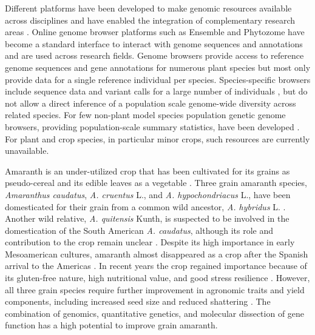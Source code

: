 \documentclass[9pt,twocolumn,twoside]{celabRxiv}
\newcommand{\jgd}[1]{{\small \textcolor{red}{#1}}}
\begin{document}
Different platforms have been developed to make genomic resources available across disciplines and have enabled the integration of complementary research areas \citep{lawrence2004maizegdb, weigel20091001, 1001:2016, joshi20121001, jin2013plncdb}. 
Online genome browser platforms such as Ensemble \citep{bolser2016ensembl} and Phytozome \citep{goodstein2012phytozome} have become a standard interface to interact with genome sequences and annotations and are used across research fields.
Genome browsers provide access to reference genome sequences and gene annotations for numerous plant species but most only provide data for a single reference individual per species.
Species-specific browsers include sequence data and variant calls for a large number of individuals \citep{lawrence2004maizegdb, ming2015pineapple, dash2016legume,hazzouri2015whole, krishnakumar2015araport, mansueto2017rice, kudo2017tomatomics}, but do not allow a direct inference of a population scale genome-wide diversity across related species.
For few non-plant model species population genetic genome browsers, providing population-scale summary statistics, have been developed \citep{10.1093/nar/gkx943,10.1093/bioinformatics/btx301}.
For plant and crop species, in particular minor crops, such resources are currently unavailable.

Amaranth is an under-utilized crop that has been cultivated for its grains as pseudo-cereal and its edible leaves as a vegetable \citep{sauer1967grain,brenner2000genetic, joshi2018zero}. 
Three grain amaranth species, \textit{Amaranthus caudatus}, \textit{A. cruentus} L., and \textit{A. hypochondriacus} L., have been domesticated for their grain from a common wild ancestor, \textit{A. hybridus} L. \citep{stetter2020parallel}. 
Another wild relative, \textit{A. quitensis} Kunth, is suspected to be involved in the domestication of the South American \textit{A. caudatus}, although its role and contribution to the crop remain unclear \citep{kietlinski2014relationships,stetter2017genomic, stetter2020parallel}.
Despite its high importance in early Mesoamerican cultures, amaranth almost disappeared as a crop after the Spanish arrival to the Americas \citep{sauer1967grain}.
In recent years the crop regained importance because of its gluten-free nature, high nutritional value, and good stress resilience \citep{stallknecht1993amaranth, silva2008bioactive, de2009amaranth}. 
However, all three grain species require further improvement in agronomic traits and yield components, including increased seed size and reduced shattering \citep{joshi2018zero,brenner2000genetic}.
The combination of genomics, quantitative genetics, and molecular dissection of gene function has a high potential to improve grain amaranth.
\end{document}
